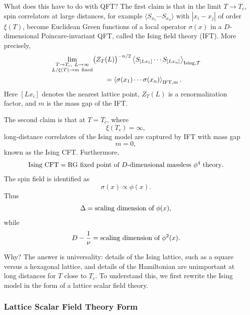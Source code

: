 What does this have to do with QFT?  The first claim is that in the limit
\(T\to T_c\), spin correlators at large distances, for example
\(\langle S_{x_1}\cdots S_{x_n}\rangle\) with \(|x_i-x_j|\) of order
\(\xi(T)\), become Euclidean Green functions of a local operator
\(\sigma(x)\) in a \(D\)-dimensional Poincare-invariant QFT, called the
Ising field theory (IFT).  More precisely,
\[
\begin{aligned}
  &\lim_{\substack{T\to T_c,\ L\to\infty\\ L/\xi(T)\to m\ {\rm fixed}}}
  \bigl(Z_T(L)\bigr)^{-n/2}
  \left\langle
    S_{[Lx_1]}\cdots S_{[Lx_n]}
  \right\rangle_{{\rm Ising},T}
\\
  &\hspace{8em}
  =
  \left\langle
    \sigma(x_1)\cdots\sigma(x_n)
  \right\rangle_{{\rm IFT},m}.
\end{aligned}
\]
Here \([Lx_i]\) denotes the nearest lattice point, \(Z_T(L)\) is a
renormalization factor, and \(m\) is the mass gap of the IFT.

The second claim is that at \(T=T_c\), where
\[
  \xi(T_c)=\infty,
\]
long-distance correlators of the Ising model are captured by IFT with mass
gap
\[
  m=0,
\]
known as the Ising CFT.  Furthermore,
\[
  \hbox{Ising CFT}
  =
  \hbox{RG fixed point of \(D\)-dimensional massless \(\phi^4\) theory}.
\]
The spin field is identified as
\[
  \sigma(x)\propto\phi(x).
\]
Thus
\[
  \Delta=\hbox{scaling dimension of }\phi(x),
\]
while
\[
  D-\frac{1}{\nu}
  =
  \hbox{scaling dimension of }\phi^2(x).
\]

Why?  The answer is universality: details of the Ising lattice, such as a
square versus a hexagonal lattice, and details of the Hamiltonian are
unimportant at long distances for \(T\) close to \(T_c\).  To understand this,
we first rewrite the Ising model in the form of a lattice scalar field theory.

\subsubsection{Lattice Scalar Field Theory Form}

